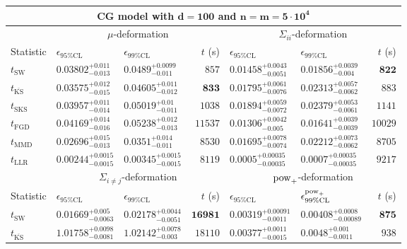 \begin{tabular}{l|llr|llr}
	\toprule
	\multicolumn{7}{c}{{\bf CG model with $\mathbf{d=100}$ and $\mathbf{n=m=5\cdot 10^{4}}$}} \\
	\toprule
	\multicolumn{1}{c}{} & \multicolumn{3}{c}{$\mu$-deformation} & \multicolumn{3}{c}{$\Sigma_{ii}$-deformation} \\
	Statistic & $\epsilon_{95\%\mathrm{CL}}$ & $\epsilon_{99\%\mathrm    {CL}}$ & $t$ (s) & $\epsilon_{95\%\mathrm{CL}}$ & $\epsilon_{99\%\mathrm{CL}}$ & $t$ (s) \\
	\midrule
	$t_{\mathrm{SW}}$ & $0.03802_{-0.013}^{+0.011}$ & $0.0489_{-0.011}^{+0.0099}$ & $857$ & $0.01458_{-0.0051}^{+0.0043}$ & $0.01856_{-0.004}^{+0.0039}$ & ${\mathbf{822}}$ \\
	$t_{\overline{\mathrm{KS}}}$ & $0.03575_{-0.015}^{+0.012}$ & $0.04605_{-0.012}^{+0.011}$ & ${\mathbf{833}}$ & $0.01795_{-0.0076}^{+0.0061}$ & $0.02313_{-0.0062}^{+0.0057}$ & $883$ \\
	$t_{\mathrm{SKS}}$ & $0.03957_{-0.014}^{+0.011}$ & $0.05019_{-0.011}^{+0.01}$ & $1038$ & $0.01894_{-0.0072}^{+0.0059}$ & $0.02379_{-0.0061}^{+0.0053}$ & $1141$ \\
	$t_{\mathrm{FGD}}$ & $0.04169_{-0.016}^{+0.014}$ & $0.05238_{-0.013}^{+0.012}$ & $11537$ & ${\mathbf{0.01306_{-0.005}^{+0.0042}}}$ & ${\mathbf{0.01641_{-0.0039}^{+0.0039}}}$ & $10029$ \\
	$t_{\mathrm{MMD}}$ & ${\mathbf{0.02696_{-0.013}^{+0.015}}}$ & ${\mathbf{0.0351_{-0.011}^{+0.014}}}$ & $8530$ & $0.01695_{-0.0074}^{+0.0078}$ & $0.02212_{-0.0062}^{+0.0073}$ & $8705$ \\
	$t_{\mathrm{LLR}}$ & $0.00244_{-0.0015}^{+0.0015}$ & $0.00345_{-0.0015}^{+0.0015}$ & $8119$ & $0.0005_{-0.00035}^{+0.00035}$ & $0.0007_{-0.00035}^{+0.00035}$ & $9217$ \\
	\toprule
	\multicolumn{1}{c}{} & \multicolumn{3}{c}{$\Sigma_{i\neq j}$-deformation} & \multicolumn{3}{c}{$\rm{pow}_{+}$-deformation} \\
	Statistic & $\epsilon_{95\%\mathrm{CL}}$ & $\epsilon_{99\%\mathrm{CL}}$ & $t$ (s) & $\epsilon_{95\%\mathrm{CL}}$ & $\epsilon^{\rm   {pow}_{+}}_{99\%\mathrm{CL}}$ & $t$ (s) \\
	\midrule
	$t_{\mathrm{SW}}$ & $0.01669_{-0.0063}^{+0.005}$ & $0.02178_{-0.0051}^{+0.0044}$ & ${\mathbf{16981}}$ & $0.00319_{-0.0011}^{+0.00091}$ & $0.00408_{-0.00089}^{+0.0008}$ & ${\mathbf{875}}$ \\
	$t_{\overline{\mathrm{KS}}}$ & $1.01758_{-0.0081}^{+0.0098}$ & $1.02142_{-0.003}^{+0.0078}$ & $18110$ & $0.00377_{-0.0015}^{+0.0011}$ & $0.0048_{-0.0011}^{+0.001}$ & $938$ \\

\end{tabular}
